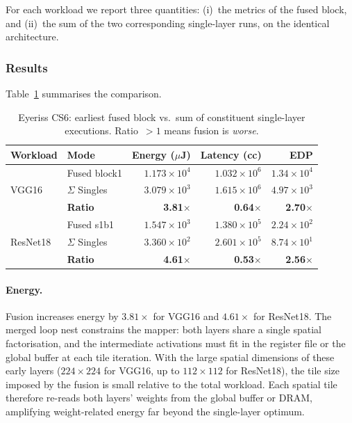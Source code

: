 For each workload we report three quantities:
(i)~the metrics of the fused block, and
(ii)~the sum of the two corresponding single-layer runs, on the
identical architecture.

\subsubsection{Results}

Table~\ref{tab:eyeriss-cs6} summarises the comparison.

\begin{table}[htbp]
  \centering
  \caption{Eyeriss CS6: earliest fused block vs.\ sum of constituent
    single-layer executions.
    Ratio~$> 1$ means fusion is \emph{worse}.}
  \label{tab:eyeriss-cs6}
  \begin{tabular}{ll rrr}
    \toprule
    Workload & Mode & Energy ($\mu$J) & Latency (cc) & EDP \\
    \midrule
    \multirow{3}{*}{VGG16}
      & Fused block1       & $1.173 \times 10^{4}$ & $1.032 \times 10^{6}$
        & $1.34 \times 10^{4}$ \\
      & $\Sigma$ Singles    & $3.079 \times 10^{3}$ & $1.615 \times 10^{6}$
        & $4.97 \times 10^{3}$ \\
      & \textbf{Ratio}     & \textbf{3.81$\times$} & \textbf{0.64$\times$}
        & \textbf{2.70$\times$} \\
    \midrule
    \multirow{3}{*}{ResNet18}
      & Fused s1b1          & $1.547 \times 10^{3}$ & $1.380 \times 10^{5}$
        & $2.24 \times 10^{2}$ \\
      & $\Sigma$ Singles     & $3.360 \times 10^{2}$ & $2.601 \times 10^{5}$
        & $8.74 \times 10^{1}$ \\
      & \textbf{Ratio}      & \textbf{4.61$\times$} & \textbf{0.53$\times$}
        & \textbf{2.56$\times$} \\
    \bottomrule
  \end{tabular}
\end{table}

\paragraph{Energy.}
Fusion increases energy by $3.81 \times$ for VGG16 and
$4.61 \times$ for ResNet18.
The merged loop nest constrains the mapper: both layers share a
single spatial factorisation, and the intermediate activations must
fit in the register file or the global buffer at each tile iteration.
With the large spatial dimensions of these early layers
($224 \times 224$ for VGG16, up to $112 \times 112$ for ResNet18),
the tile size imposed by the fusion is small relative to the total
workload.
Each spatial tile therefore re-reads both layers' weights from the
global buffer or DRAM, amplifying weight-related energy far beyond
the single-layer optimum.

